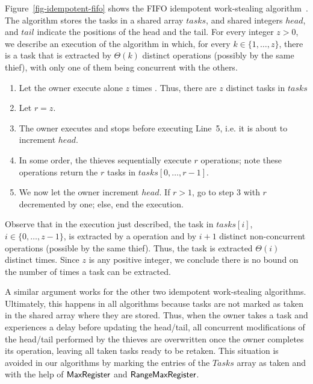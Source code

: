 Figure~\ref{fig-idempotent-fifo} shows the FIFO idempotent work-stealing algorithm~\cite{maged.vechev.2009}. The algorithm stores the tasks in a shared array $tasks$, and shared integers $head$, and $tail$ indicate the positions of the head and the tail.  For every integer $z > 0$, we describe an execution of the algorithm in which, for every $k \in \{1, \hdots, z\}$, there is a task that is extracted by $\Theta(k)$ distinct operations (possibly by the same thief), with only one of them being concurrent with the others.

\begin{enumerate}

\item Let the owner execute alone $z$ times \Put. Thus, there are $z$ distinct tasks in $tasks$

\item Let $r = z$.

\item The owner executes \Take and stops before executing Line~5, i.e.  it is about to increment $head$.

\item In some order, the thieves sequentially execute $r$ \Steal operations; note these \Steal operations return the $r$ tasks in $tasks[0, \hdots, r-1]$.

\item We now let the owner increment $head$. If $r > 1$, go to step 3 with $r$ decremented by one; else, end the execution.
\end{enumerate}

Observe that in the execution just described, the task in $tasks[i]$, $i \in \{0, \hdots, z-1\}$, is extracted by a \Take operation and by $i+1$ distinct non-concurrent \Steal operations (possible by the same thief).  Thus, the task is extracted $\Theta(i)$ distinct times.  Since $z$ is any positive integer, we conclude there is no bound on the number of times a task can be extracted.

A similar argument works for the other two idempotent work-stealing algorithms.  Ultimately, this happens in all algorithms because tasks are not marked as taken in the shared array where they are stored. Thus, when the owner takes a task and experiences a delay before updating the head/tail, all concurrent modifications of the head/tail performed by the thieves are overwritten once the owner completes its operation, leaving all taken tasks ready to be retaken.  This situation is avoided in our algorithms by marking the entries of the $Tasks$ array as taken and with the help of ${\sf MaxRegister}$ and ${\sf RangeMaxRegister}$.

